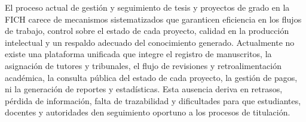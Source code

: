 El proceso actual de gestión y seguimiento de tesis y proyectos de grado en la FICH carece de mecanismos sistematizados que garanticen eficiencia en los flujos de trabajo, control sobre el estado de cada proyecto, calidad en la producción intelectual y un respaldo adecuado del conocimiento generado. Actualmente no existe una plataforma unificada que integre el registro de manuscritos, la asignación de tutores y tribunales, el flujo de revisiones y retroalimentación académica, la consulta pública del estado de cada proyecto, la gestión de pagos, ni la generación de reportes y estadísticas. Esta ausencia deriva en retrasos, pérdida de información, falta de trazabilidad y dificultades para que estudiantes, docentes y autoridades den seguimiento oportuno a los procesos de titulación.
